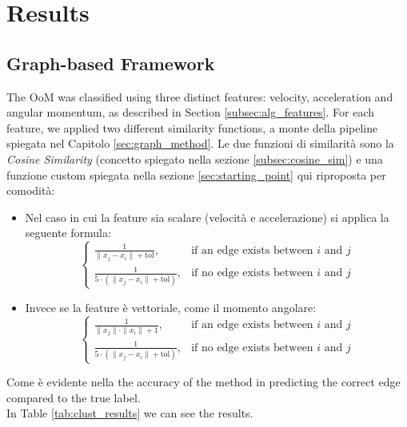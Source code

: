 \chapter{Results}

\section{Graph-based Framework}
The OoM was classified using three distinct features: velocity, acceleration and angular momentum, as described in Section \ref{subsec:alg_features}.
For each feature, we applied two different similarity functions, a monte della pipeline spiegata nel Capitolo \ref{sec:graph_method}.
Le due funzioni di similarità sono la \textit{Cosine Similarity} (concetto spiegato nella sezione \ref{subsec:cosine_sim}) e una funzione custom spiegata nella sezione \ref{sec:starting_point} qui riproposta per comodità:
\begin{itemize}
  \item Nel caso in cui la feature sia scalare (velocità e accelerazione) si applica la seguente formula:
  \begin{equation}
    \left\{
      \begin{array}{ll}
        \frac{1}{{\|x_{j} - x_{i}\| + \text{tol}}}, & \text{if an edge exists between } i \text{ and } j \\
        \frac{1}{{5 \cdot (\|x_{j} - x_{i}\| + \text{tol})}}, & \text{if no edge exists between } i \text{ and } j 
        \end{array}
      \right.
  \end{equation}
  \item Invece se la feature è vettoriale, come il momento angolare:
  \begin{equation}
    \left\{
      \begin{array}{ll}
        \frac{1}{{\|x_{j}\| \cdot \|x_{i}\| + 1}}, & \text{if an edge exists between } i \text{ and } j \\
        \frac{1}{{5 \cdot (\|x_{j} - x_{i}\| + \text{tol})}}, & \text{if no edge exists between } i \text{ and } j 
        \end{array}
      \right.
  \end{equation}
\end{itemize}

Come è evidente nella the accuracy of the method in predicting the correct edge compared to the true label.\\
In Table \ref{tab:clust_results} we can see the results.

